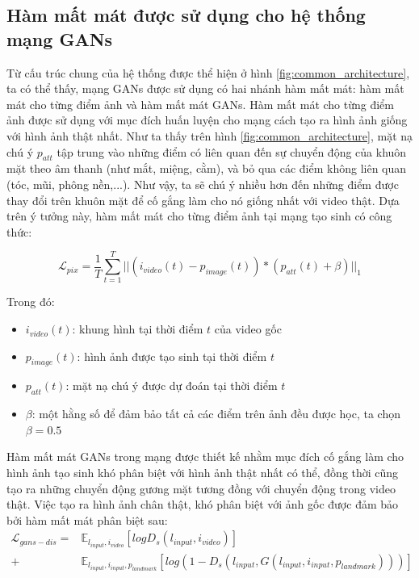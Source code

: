 \subsection{Hàm mất mát được sử dụng cho hệ thống mạng GANs}

Từ cấu trúc chung của hệ thống được thể hiện ở hình \ref{fig:common_architecture}, ta có thể thấy, mạng GANs được sử dụng có hai nhánh hàm mất mát: hàm mất mát cho từng điểm ảnh và hàm mất mát GANs. Hàm mất mát cho từng điểm ảnh được sử dụng với mục đích huấn luyện cho mạng cách tạo ra hình ảnh giống với hình ảnh thật nhất. Như ta thấy trên hình \ref{fig:common_architecture}, mặt nạ chú ý $p_{att}$ tập trung vào những điểm có liên quan đến sự chuyển động của khuôn mặt theo âm thanh (như mắt, miệng, cằm), và bỏ qua các điểm không liên quan (tóc, mũi, phông nền,...). Như vậy, ta sẽ chú ý nhiều hơn đến những điểm được thay đổi trên khuôn mặt để cố gắng làm cho nó giống nhất với video thật. Dựa trên ý tưởng này, hàm mất mát cho từng điểm ảnh tại mạng tạo sinh có công thức:

\begin{equation}
    \mathcal{L}_{pix} = \frac{1}{T}\sum^T_{t=1}||(i_{video}(t)-p_{image}(t))*(p_{att}(t)+\beta)||_1
\end{equation}

Trong đó:
\begin{itemize}
    \item \textbf{$i_{video}(t)$}: khung hình tại thời điểm $t$ của video gốc
    \item \textbf{$p_{image}(t)$}: hình ảnh được tạo sinh tại thời điểm $t$
    \item \textbf{$p_{att}(t)$}: mặt nạ chú ý được dự đoán tại thời điểm $t$
    \item \textbf{$\beta$}: một hằng số để đảm bảo tất cả các điểm trên ảnh đều được học, ta chọn $\beta = 0.5$ 
\end{itemize}

Hàm mất mát GANs trong mạng được thiết kế nhằm mục đích cố gắng làm cho hình ảnh tạo sinh khó phân biệt với hình ảnh thật nhất có thể, đồng thời cũng tạo ra những chuyển động gương mặt tương đồng với chuyển động trong video thật. Việc tạo ra hình ảnh chân thật, khó phân biệt với ảnh gốc được đảm bảo bởi hàm mất mát phân biệt sau:
\begin{equation}
    \begin{split}
    \mathcal{L}_{gans-dis} = &\mathbb{E}_{l_{input},i_{video}}[logD_s(l_{input},i_{video})]\\
    +&\mathbb{E}_{l_{input},i_{input},p_{landmark}}[log(1-D_s(l_{input},G(l_{input},i_{input},p_{landmark})))]
    \end{split}
\end{equation}

